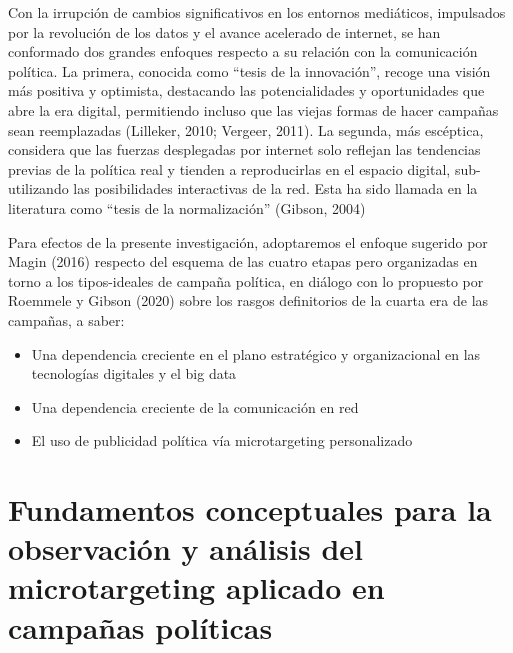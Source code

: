 \documentclass[
  10pt,
  letterpaper,
]{report}
\providecommand{\tightlist}{%
  \setlength{\itemsep}{0pt}\setlength{\parskip}{0pt}}
\begin{document}
Con la irrupción de cambios significativos en los entornos mediáticos,
impulsados por la revolución de los datos y el avance acelerado de
internet, se han conformado dos grandes enfoques respecto a su relación
con la comunicación política. La primera, conocida como ``tesis de la
innovación'', recoge una visión más positiva y optimista, destacando las
potencialidades y oportunidades que abre la era digital, permitiendo
incluso que las viejas formas de hacer campañas sean reemplazadas
(Lilleker, 2010; Vergeer, 2011). La segunda, más escéptica, considera
que las fuerzas desplegadas por internet solo reflejan las tendencias
previas de la política real y tienden a reproducirlas en el espacio
digital, sub-utilizando las posibilidades interactivas de la red. Esta
ha sido llamada en la literatura como ``tesis de la normalización''
(Gibson, 2004)

Para efectos de la presente investigación, adoptaremos el enfoque
sugerido por Magin (2016) respecto del esquema de las cuatro etapas pero
organizadas en torno a los tipos-ideales de campaña política, en diálogo
con lo propuesto por Roemmele y Gibson (2020) sobre los rasgos
definitorios de la cuarta era de las campañas, a saber:

\begin{itemize}
\tightlist
\item
  Una dependencia creciente en el plano estratégico y organizacional en
  las tecnologías digitales y el big data
\item
  Una dependencia creciente de la comunicación en red
\item
  El uso de publicidad política vía microtargeting personalizado
\end{itemize}

\hypertarget{fundamentos-conceptuales-para-la-observaciuxf3n-y-anuxe1lisis-del-microtargeting-aplicado-en-campauxf1as-poluxedticas}{%
\section{Fundamentos conceptuales para la observación y análisis del
microtargeting aplicado en campañas
políticas}\label{fundamentos-conceptuales-para-la-observaciuxf3n-y-anuxe1lisis-del-microtargeting-aplicado-en-campauxf1as-poluxedticas}}
\end{document}
